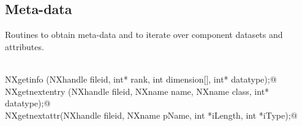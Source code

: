 \documentclass[12pt]{article}
\begin{document}
\subsection{Meta-data} 
\label{ss:meta}

Routines to obtain meta-data and to iterate over component datasets and attributes.

\begin{flushleft} \small
\begin{minipage}{\linewidth} \label{scrap19}
\vspace{-1ex}
\begin{list}{}{} \item
\mbox{}\verb@@\\
\mbox{}\verb@NXstatus  NXgetinfo     (NXhandle fileid, int* rank, int dimension[], int* datatype);@\\
\mbox{}\verb@NXstatus  NXgetnextentry     (NXhandle fileid, NXname name, NXname class, int* datatype);@\\
\mbox{}\verb@NXstatus  NXgetnextattr(NXhandle fileid, NXname pName, int *iLength, int *iType);@\\
\end{list}
\vspace{-1ex}
\footnotesize\addtolength{\baselineskip}{-1ex}
\end{minipage}\\[4ex]
\end{flushleft}
\end{document}
